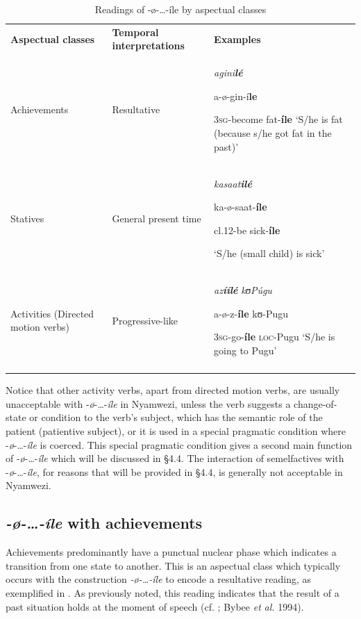 \documentclass[output=paper]{langscibook}
\begin{document}
\begin{table}
\caption{Readings of -ø-…-íle by aspectual classes}
\label{tab:kanijo:2}
\begin{tabularx}{\textwidth}{XXX}
\lsptoprule
\bfseries Aspectual classes & \bfseries Temporal interpretations & \bfseries Examples \\
Achievements & Resultative & \textit{agini}\textbf{\textit{lé}} 

a-ø-gin-í\textbf{le} 

3\textsc{sg}-become fat-\textbf{íle} 
‘S/he is fat (because s/he got fat in the past)’\\
Statives & General present time & \textit{kasaat}\textbf{\textit{i}}\textbf{\textit{lé}} 

ka\footnotemark{}-ø-saat-\textbf{íle} 

cl.12-be sick-\textbf{íle}

‘S/he (small child) is sick’\\
Activities (Directed motion verbs) & Progressive-like & \textit{az}\textbf{\textit{íílé}         }\textit{kʊ}\textit{Púgu}

a-ø-z-\textbf{íle}    kʊ-Pugu

3\textsc{sg}-go-\textbf{íle} \textsc{loc}-Pugu 
‘S/he is going to Pugu’\\
\lspbottomrule
\end{tabularx}
\end{table} 


Notice that other activity verbs, apart from directed motion verbs, are usually unacceptable with -\textit{ø}-…-\textit{íle} in Nyamwezi, unless the verb suggests a change-of-state or condition to the verb’s subject, which has the semantic role of the patient (patientive subject), or it is used in a special pragmatic condition where -\textit{ø}-…-\textit{íle} is coerced. This special pragmatic condition gives a second main function of -\textit{ø}-…-\textit{íle} which will be discussed in §4.4. The interaction of semelfactives with -\textit{ø}-…-\textit{íle}, for reasons that will be provided in §4.4, is generally not acceptable in Nyamwezi. 
 
\subsection{\textit{-}\textit{ø-\ldots-íle} with achievements}

Achievements predominantly have a punctual nuclear phase which indicates a transition from one state to another. This is an aspectual class which typically occurs with the construction \textit{-ø}\textit{-…-íle} to encode a resultative reading, as exemplified in . As previously noted, this reading indicates that the result of a past situation holds at the moment of speech (cf. \citealt{Comrie1976}; Bybee \textit{et} \textit{al.} 1994).
\end{document}
